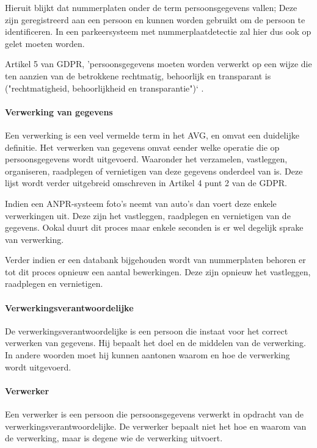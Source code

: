 Hieruit blijkt dat nummerplaten onder de term persoonsgegevens vallen; Deze zijn geregistreerd aan een persoon en kunnen worden gebruikt om de persoon te identificeren. In een parkeersysteem met nummerplaatdetectie zal hier dus ook op gelet moeten worden. 

Artikel 5 van GDPR, 'persoonsgegevens moeten worden verwerkt op een wijze die ten aanzien van de betrokkene rechtmatig, behoorlijk en transparant is ("rechtmatigheid, behoorlijkheid en transparantie")` \autocite{avg2018privacy}.

\paragraph{Verwerking van gegevens}
Een verwerking is een veel vermelde term in het AVG, en omvat een duidelijke definitie. Het verwerken van gegevens omvat eender welke operatie die op persoonsgegevens wordt uitgevoerd. Waaronder het verzamelen, vastleggen, organiseren, raadplegen of vernietigen van deze gegevens onderdeel van is. Deze lijst wordt verder uitgebreid omschreven in Artikel 4 punt 2 van de GDPR.

Indien een ANPR-systeem foto's neemt van auto's dan voert deze enkele verwerkingen uit. Deze zijn het vastleggen, raadplegen en vernietigen van de gegevens. Ookal duurt dit proces maar enkele seconden is er wel degelijk sprake van verwerking.

Verder indien er een databank bijgehouden wordt van nummerplaten behoren er tot dit proces opnieuw een aantal bewerkingen. Deze zijn opnieuw het vastleggen, raadplegen en vernietigen.

\paragraph{Verwerkingsverantwoordelijke}
De verwerkingsverantwoordelijke is een persoon die instaat voor het correct verwerken van gegevens. Hij bepaalt het doel en de middelen van de verwerking. In andere woorden moet hij kunnen aantonen waarom en hoe de verwerking wordt uitgevoerd.

\paragraph{Verwerker}
Een verwerker is een persoon die persoonsgegevens verwerkt in opdracht van de verwerkingsverantwoordelijke. De verwerker bepaalt niet het hoe en waarom van de verwerking, maar is degene wie de verwerking uitvoert.

